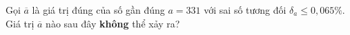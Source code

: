 \begin{ex}
Gọi $\overline a$ là giá trị đúng của số gần đúng $a=331$ với sai số tương đối $\delta_a\le0{,}065\%$. Giá trị $\overline a$ nào sau đây \textbf{không} thể xảy ra?
\end{ex}

